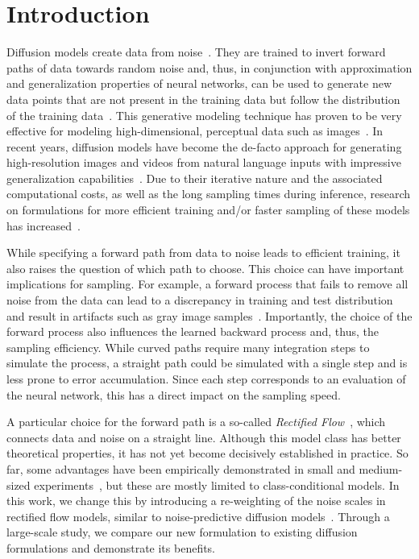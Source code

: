 \section{Introduction}%
\label{sec:intro}
Diffusion models create data from noise~\citep{Song2020ScoreBasedGM}. 
They are trained to 
%
invert forward paths of data towards random noise and, thus, %
in 
conjunction with approximation and generalization properties of neural networks, %
can be used to generate new data points that are not present in the training data but follow the distribution of the training data~\citep{SohlDickstein2015DeepUL, song2020generative}. This generative modeling technique has proven to be very effective for modeling high-dimensional, perceptual data such as images~\citep{ho2020denoising}. In recent years, diffusion models have become the de-facto approach for generating high-resolution images and videos from natural language inputs with impressive generalization capabilities~\citep{saharia2022photorealistic, ramesh2022hierarchical, Rombach_2022, podell2023sdxl, dai2023emu, esser2023structure, blattmann2023align, betker2023improving, blattmann2023stable, singer2022makeavideo}. Due to their iterative nature and the associated computational costs, as well as the long sampling times during inference, research on formulations for more efficient training and/or faster sampling of these models has increased~\citep{karras2023analyzing, liu2022flow}. 

While specifying a forward path from data to noise leads to efficient training, it also raises the question of which path to choose. 
This choice can have important implications for sampling. For example, a forward process that fails to remove all noise from the data can lead to a discrepancy in training and test distribution and result in artifacts such as gray image samples~\citep{lin2024common}. 
Importantly, the choice of the forward process also influences the learned backward process and, thus, the sampling efficiency. While curved paths require many integration steps to simulate the process, a straight path could be simulated with a single step and is less prone to error accumulation. Since each step corresponds to an evaluation of the neural network, this has a direct impact on the sampling speed.

A particular choice for the forward path is a so-called \emph{Rectified Flow}~\citep{liu2022flow,albergo2022building,lipman2023flow}, which connects data and noise on a straight line. Although this model class has better theoretical properties, it has not yet become decisively established in practice. So far, some advantages have been empirically demonstrated in small and medium-sized experiments~\cite{ma2024sit}, but these are mostly limited to class-conditional models. 
In this work, we change this by introducing a re-weighting of the noise scales in rectified flow models, similar to noise-predictive diffusion models~\citep{ho2020denoising}. Through a large-scale study, we compare our new formulation to existing diffusion formulations and demonstrate its benefits.  

